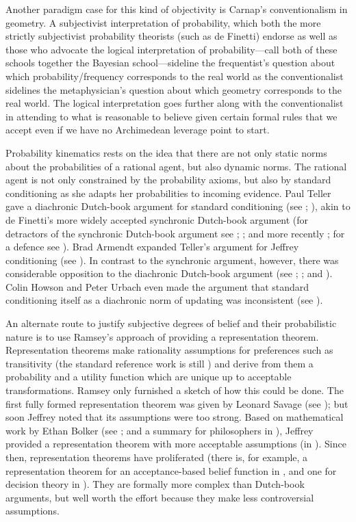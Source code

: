 \documentclass[11pt]{article}
\begin{document}
Another paradigm case for this kind of objectivity is Carnap's
conventionalism in geometry. A subjectivist interpretation of
probability, which both the more strictly subjectivist probability
theorists (such as de Finetti) endorse as well as those who advocate
the logical interpretation of probability---call both of these schools
together the Bayesian school---sideline the frequentist's question
about which probability/frequency corresponds to the real world as the
conventionalist sidelines the metaphysician's question about which
geometry corresponds to the real world. The logical interpretation
goes further along with the conventionalist in attending to what is
reasonable to believe given certain formal rules that we accept even
if we have no Archimedean leverage point to start.

Probability kinematics rests on the idea that there are not only
static norms about the probabilities of a rational agent, but also
dynamic norms. The rational agent is not only constrained by the
probability axioms, but also by standard conditioning as she adapts
her probabilities to incoming evidence. Paul Teller gave a diachronic
Dutch-book argument for standard conditioning (see
; ), akin to de Finetti's
more widely accepted synchronic Dutch-book argument (for detractors of
the synchronic Dutch-book argument see ;
; and more recently
; for a defence see ).
Brad Armendt expanded Teller's argument for Jeffrey conditioning (see
). In contrast to the synchronic argument,
however, there was considerable opposition to the diachronic
Dutch-book argument (see ; ;
and ). Colin Howson and Peter Urbach even made the
argument that standard conditioning itself as a diachronic norm of
updating was inconsistent (see ).

An alternate route to justify subjective degrees of belief and their
probabilistic nature is to use Ramsey's approach of providing a
representation theorem. Representation theorems make rationality
assumptions for preferences such as transitivity (the standard
reference work is still ) and derive from them a
probability and a utility function which are unique up to acceptable
transformations. Ramsey only furnished a sketch of how this could be
done. The first fully formed representation theorem was given by
Leonard Savage (see ); but soon Jeffrey noted
that its assumptions were too strong. Based on mathematical work by
Ethan Bolker (see ; and a summary for
philosophers in ), Jeffrey provided a
representation theorem with more acceptable assumptions (in
). Since then, representation theorems have
proliferated (there is, for example, a representation theorem for an
acceptance-based belief function in , and one for
decision theory in ). They are formally more
complex than Dutch-book arguments, but well worth the effort because
they make less controversial assumptions.
\end{document}
